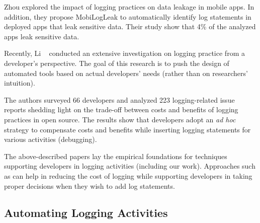 Zhou \etal \cite{zhou2020mobilogleak} explored the impact of logging practices on data leakage in mobile apps. In addition, they propose MobiLogLeak to automatically identify log statements in deployed apps that leak sensitive data. Their study show that 4\% of the analyzed apps leak sensitive data.

Recently, Li \etal~\cite{li2020qualitative} conducted an extensive investigation on logging practice from a developer's perspective. The goal of this research is to push the design of automated tools based on actual developers' needs (rather than on researchers' intuition). 

The authors surveyed 66 developers and analyzed 223 logging-related issue reports shedding light on the trade-off between costs and benefits of logging practices in open source. The results show that developers adopt an \emph{ad hoc} strategy to compensate costs and benefits while inserting logging statements for various activities (\eg debugging). 

The above-described papers lay the empirical foundations for techniques supporting developers in logging activities (including our work). Approaches such as \tool can help in reducing the cost of logging while supporting developers in taking proper decisions when they wish to add log statements.


\subsection{Automating Logging Activities}

